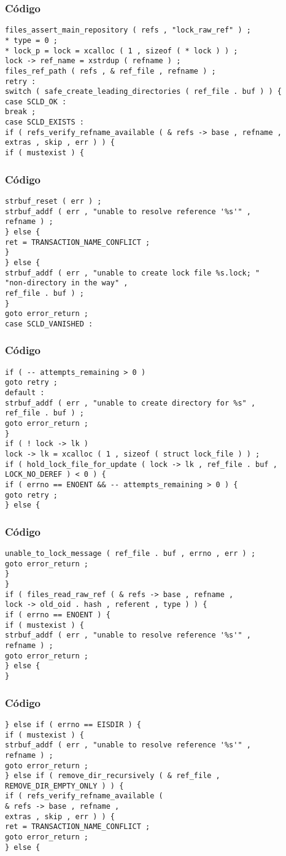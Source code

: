 \documentclass{beamer}
\begin{document}
\begin{frame}[fragile]
\frametitle{C\'odigo}
\begin{verbatim}
files_assert_main_repository ( refs , "lock_raw_ref" ) ; 
* type = 0 ; 
* lock_p = lock = xcalloc ( 1 , sizeof ( * lock ) ) ; 
lock -> ref_name = xstrdup ( refname ) ; 
files_ref_path ( refs , & ref_file , refname ) ; 
retry : 
switch ( safe_create_leading_directories ( ref_file . buf ) ) { 
case SCLD_OK : 
break ; 
case SCLD_EXISTS : 
if ( refs_verify_refname_available ( & refs -> base , refname , 
extras , skip , err ) ) { 
if ( mustexist ) { 
\end{verbatim}
\end{frame}
\begin{frame}[fragile]
\frametitle{C\'odigo}
\begin{verbatim}
strbuf_reset ( err ) ; 
strbuf_addf ( err , "unable to resolve reference '%s'" , 
refname ) ; 
} else { 
ret = TRANSACTION_NAME_CONFLICT ; 
} 
} else { 
strbuf_addf ( err , "unable to create lock file %s.lock; " 
"non-directory in the way" , 
ref_file . buf ) ; 
} 
goto error_return ; 
case SCLD_VANISHED : 
\end{verbatim}
\end{frame}
\begin{frame}[fragile]
\frametitle{C\'odigo}
\begin{verbatim}
if ( -- attempts_remaining > 0 ) 
goto retry ; 
default : 
strbuf_addf ( err , "unable to create directory for %s" , 
ref_file . buf ) ; 
goto error_return ; 
} 
if ( ! lock -> lk ) 
lock -> lk = xcalloc ( 1 , sizeof ( struct lock_file ) ) ; 
if ( hold_lock_file_for_update ( lock -> lk , ref_file . buf , LOCK_NO_DEREF ) < 0 ) { 
if ( errno == ENOENT && -- attempts_remaining > 0 ) { 
goto retry ; 
} else { 
\end{verbatim}
\end{frame}
\begin{frame}[fragile]
\frametitle{C\'odigo}
\begin{verbatim}
unable_to_lock_message ( ref_file . buf , errno , err ) ; 
goto error_return ; 
} 
} 
if ( files_read_raw_ref ( & refs -> base , refname , 
lock -> old_oid . hash , referent , type ) ) { 
if ( errno == ENOENT ) { 
if ( mustexist ) { 
strbuf_addf ( err , "unable to resolve reference '%s'" , 
refname ) ; 
goto error_return ; 
} else { 
} 
\end{verbatim}
\end{frame}
\begin{frame}[fragile]
\frametitle{C\'odigo}
\begin{verbatim}
} else if ( errno == EISDIR ) { 
if ( mustexist ) { 
strbuf_addf ( err , "unable to resolve reference '%s'" , 
refname ) ; 
goto error_return ; 
} else if ( remove_dir_recursively ( & ref_file , 
REMOVE_DIR_EMPTY_ONLY ) ) { 
if ( refs_verify_refname_available ( 
& refs -> base , refname , 
extras , skip , err ) ) { 
ret = TRANSACTION_NAME_CONFLICT ; 
goto error_return ; 
} else { 
\end{verbatim}
\end{frame}
\end{document}
